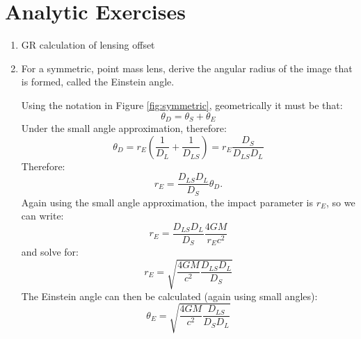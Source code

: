 \section{Analytic Exercises}

\begin{enumerate}
\item GR calculation of lensing offset
\item For a symmetric, point mass lens, derive the angular radius of the image
    that is formed, called the Einstein angle.
\begin{answer}
Using the notation in Figure \ref{fig:symmetric}, geometrically it
must be that:
\begin{equation}
\theta_D = \theta_S + \theta_E
\end{equation}
Under the small angle approximation, therefore:
\begin{equation}
\theta_D = r_E \left(\frac{1}{D_L} + \frac{1}{D_{LS}}\right) =
r_E \frac{D_S}{D_{LS} D_L} 
\end{equation}
Therefore:
\begin{equation}
r_E = \frac{D_{LS} D_L}{D_S} \theta_D.
\end{equation}
Again using the small angle approximation, the impact parameter is
$r_E$, so we can write:
\begin{equation}
r_E = \frac{D_{LS} D_L}{D_S} \frac{4GM}{r_Ec^2}
\end{equation}
and solve for:
\begin{equation}
r_E = \sqrt{\frac{4GM}{c^2} \frac{D_{LS} D_L}{D_S}}
\end{equation}
The Einstein angle can then be calculated (again using small angles):
\begin{equation}
\theta_E = \sqrt{\frac{4GM}{c^2} \frac{D_{LS}}{D_S D_L}}
\end{equation}
\end{answer}


\end{enumerate}
